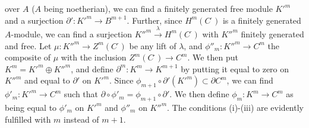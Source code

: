 
\DeclareMathOperator{\Ker}{Ker}


over $A$ ($A$ being noetherian), we can find a finitely generated free
module ${K'}^m$ and a surjection $\partial' : {K'}^m \to B^{m+1}$. Further,
since $H^m(C^{\cdot})$ is a finitely generated $A$-module, we can find a
surjection ${K''}^m \xrightarrow{\ \lambda\ } H^m(C^{\cdot})$ with ${K''}^m$
finitely generated and free. Let $\mu : {K''}^m \to Z^m(C^{\cdot})$ be any
lift of $\lambda$, and $\phi''_m : {K''}^m \to C^m$ the composite of $\mu$
with the inclusion $Z^m(C^{\cdot}) \to C^m$. We then put
$K^m = {K'}^m \oplus {K''}^m$, and define $\partial^m : K^m \to K^{m+1}$ by
putting it equal to zero on ${K''}^m$ and equal to $\partial'$ on ${K'}^m$.
Since $\phi_{m+1} \circ \partial'({K'}^m) \subset \partial C^m$, we can find
$\phi'_m : {K'}^m \to C^m$ such that
$\partial \circ \phi'_m = \phi_{m+1} \circ \partial'$. We then define
$\phi_m : K^m \to C^m$ as being equal to $\phi'_m$ on ${K'}^m$ and
$\phi''_m$ on ${K''}^m$. The conditions (i)-(iii) are evidently fulfilled
with $m$ instead of $m + 1$.

